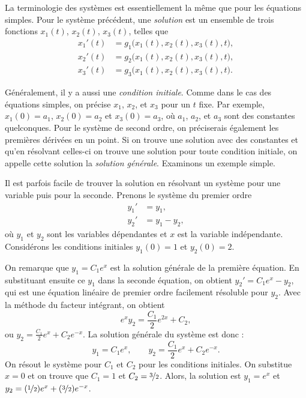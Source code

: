 La terminologie des systèmes est essentiellement la même que pour les équations simples. Pour le système précédent, une 
\emph{solution}
est un ensemble de trois fonctions $x_1(t)$, $x_2(t)$, $x_3(t)$, telles que
\begin{align*}
x_1'(t) &= g_1\bigl(x_1(t),x_2(t),x_3(t),t\bigr) , \\
x_2'(t) &= g_2\bigl(x_1(t),x_2(t),x_3(t),t\bigr) , \\
x_3'(t) &= g_3\bigl(x_1(t),x_2(t),x_3(t),t\bigr) .
\end{align*}

Généralement, il y a aussi une
\emph{condition initiale}.  Comme dans le cas des équations simples, on précise $x_1$, $x_2$, et $x_3$ pour un $t$ fixe.
Par exemple, $x_1(0) = a_1$, $x_2(0) = a_2$ et $x_3(0) = a_3$, où $a_1$, $a_2$, et $a_3$ sont des constantes quelconques. Pour le système de second ordre, on préciserais également les premières dérivées en un point. Si on trouve une solution avec des constantes et qu’en résolvant celles-ci on trouve une solution pour toute condition initiale, on appelle cette solution la \emph{solution générale}.
Examinons un exemple simple.

\begin{example}
Il est parfois facile de trouver la solution en résolvant un système pour une variable puis pour la seconde. Prenons le système du premier ordre
\begin{align*}
y_1' & = y_1 , \\
y_2' & = y_1 - y_2 ,
\end{align*}
où $y_1$ et $y_2$ sont les variables dépendantes et $x$ est la variable indépendante.  Considérons les conditions initiales 
$y_1(0) = 1$ et $y_2(0) = 2$.

On remarque que $y_1 = C_1 e^x$ est la solution générale de la première équation. En substituant ensuite ce $y_1$ dans la seconde équation, on obtient $y_2' = C_1e^x - y_2$, qui est une équation linéaire de premier ordre facilement résoluble pour $y_2$.  Avec la méthode du facteur intégrant, on obtient
\begin{equation*}
e^x y_2 = \frac{C_1}{2}e^{2x} + C_2 ,
\end{equation*}
ou $y_2 = \frac{C_1}{2}e^{x} + C_2e^{-x}$.  La solution générale du système est donc :
\begin{equation*}
y_1 = C_1 e^x , \qquad
y_2 = \frac{C_1}{2}e^{x} + C_2e^{-x} .
\end{equation*}
On résout le système pour $C_1$ et $C_2$ pour les conditions initiales. On substitue $x=0$ et on trouve que 
$C_1=1$ et $C_2=\nicefrac{3}{2}$.  Alors, la solution est
$y_1 = e^x$ et
$y_2 = (\nicefrac{1}{2}) e^x + (\nicefrac{3}{2}) e^{-x}$.
\end{example}

